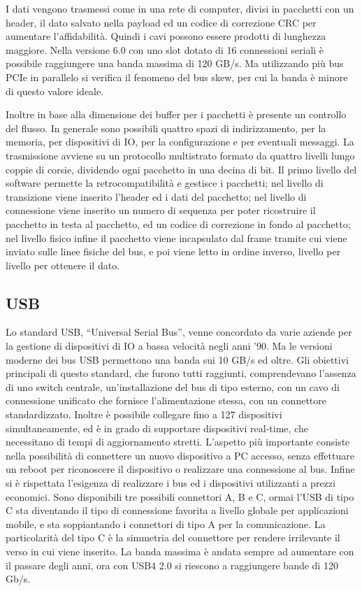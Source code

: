 \documentclass{article}
\numberwithin{equation}{subsection}
\begin{document}
I dati vengono trasmessi come in una rete di computer, divisi in pacchetti con un header, il dato salvato nella payload ed un codice di correzione CRC per aumentare l'affidabilità. 
Quindi i cavi possono essere prodotti di lunghezza maggiore. Nella versione 6.0 con uno slot dotato di 16 connessioni seriali è possibile raggiungere una banda massima di 120 GB/s. Ma 
utilizzando più bus PCIe in parallelo si verifica il fenomeno del bus skew, per cui la banda è minore di questo valore ideale. 

Inoltre in base alla dimensione dei buffer per i pacchetti è presente un controllo del flusso. In generale sono possibili quattro spazi di indirizzamento, per la memoria, per dispositivi di IO, 
per la configurazione e per eventuali messaggi. 
La trasmissione avviene su un protocollo multistrato formato da quattro livelli lungo coppie di corsie, dividendo ogni pacchetto in una decina di bit. Il primo livello del software permette 
la retrocompatibilità e gestisce i pacchetti; nel livello di transizione viene inserito l'header ed i dati del pacchetto; nel livello di connessione viene inserito un numero di sequenza per 
poter ricostruire il pacchetto in testa al pacchetto, ed un codice di correzione in fondo al pacchetto; nel livello fisico infine il pacchetto viene incapsulato dal frame tramite cui viene 
inviato sulle linee fisiche del bus, e poi viene letto in ordine inverso, livello per livello per ottenere il dato. 

\subsection{USB}

Lo standard USB, ``Universal Serial Bus'', venne concordato da varie aziende per la gestione di dispositivi di IO a bassa velocità negli anni '90. Ma le versioni moderne dei bus USB permettono 
una banda sui 10 GB/s ed oltre. Gli obiettivi principali di questo standard, che furono tutti raggiunti, comprendevano l'assenza di uno switch centrale, un'installazione del bus di tipo 
esterno, con un cavo di connessione unificato che fornisce l'alimentazione stessa, con un connettore standardizzato. Inoltre è possibile collegare fino a 127 dispositivi simultaneamente, ed 
è in grado di supportare dispositivi real-time, che necessitano di tempi di aggiornamento stretti. L'aspetto più importante consiste nella possibilità di connettere un nuovo dispositivo a PC 
accesso, senza effettuare un reboot per riconoscere il dispositivo o realizzare una connessione al bus. 
Infine si è rispettata l'esigenza di realizzare i bus ed i dispositivi utilizzanti a prezzi economici. 
Sono disponibili tre possibili connettori A, B e C, ormai l'USB di tipo C sta diventando il tipo di connessione favorita a livello globale per applicazioni mobile, e sta soppiantando 
i connettori di tipo A per la comunicazione. La particolarità del tipo C è la simmetria del connettore per rendere irrilevante il verso in cui viene inserito. La banda massima è andata 
sempre ad aumentare con il passare degli anni, ora con USB4 2.0 si riescono a raggiungere bande di 120 Gb/s. 
\end{document}
